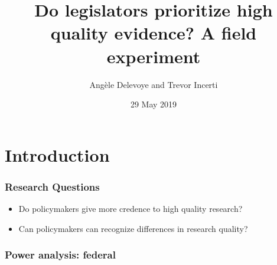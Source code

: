 \documentclass[usenames,dvipsnames]{beamer}
\title{Do legislators prioritize high quality evidence? A field experiment}
\author{Angèle Delevoye and Trevor Incerti}
\date{29 May 2019}
\begin{document}
\maketitle


\section{Introduction}

\begin{frame}
\frametitle{Research Questions}
\begin{itemize}
\item Do policymakers give more credence to high quality research?
\pause
\item Can policymakers can recognize differences in research quality?
\end{itemize}
\end{frame}




\begin{frame}
\frametitle{Power analysis: federal}


\end{frame}
\end{document}
